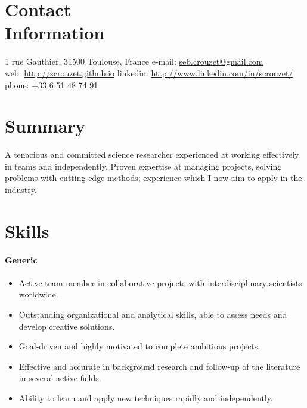 \documentclass[margin,line]{resume}
\begin{document}

\begin{resume}

    
    \vspace{3mm}
    \section{\mysidestyle Contact\\Information}
    1 rue Gauthier, 31500 Toulouse, France
    \hfill e-mail: \href{mailto:seb.crouzet@gmail.com}{seb.crouzet@gmail.com} \\
    web: \url{http://scrouzet.github.io} \hfill linkedin: \url{http://www.linkedin.com/in/scrouzet/}\\
    \hfill phone: +33 6 51 48 74 91 \\ 

    \vspace{3mm}
    \section{\mysidestyle Summary}
    \vspace{-0.5mm}

	A tenacious and committed science researcher experienced at working effectively in teams and independently. Proven expertise at managing projects, solving problems with cutting-edge methods; experience which I now aim to apply in the industry. 



    \vspace{3mm}
    \section{\mysidestyle Skills}
    \vspace{-0.5mm}

	\paragraph{Generic}
	\begin{itemize} \itemsep1pt \parskip0pt  \leftmargin=0em \itemindent=-1.5em
  		\item Active team member in collaborative projects with interdisciplinary scientists worldwide.
  		\item Outstanding organizational and analytical skills, able to assess needs and develop creative solutions. 
  		\item Goal-driven and highly motivated to complete ambitious projects.
  		\item Effective and accurate in background research and follow-up of the literature in several active fields.
  		\item Ability to learn and apply new techniques rapidly and independently.
	\end{itemize}


\end{resume}
\end{document}

